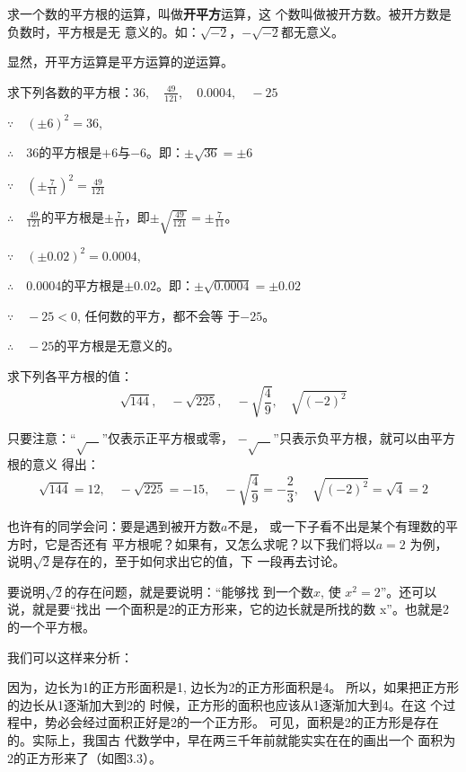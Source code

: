 求一个数的平方根的运算，叫做\textbf{开平方}运算，这
个数叫做被开方数。被开方数是负数时，平方根是无
意义的。如：$\sqrt{-2}$，$-\sqrt{-2}$都无意义。

显然，开平方运算是平方运算的逆运算。

\begin{example}
    求下列各数的平方根：$36,\quad \frac{49}{121},\quad 0.0004,\quad -25$
\end{example}

\begin{solution}
$\because\quad (\pm 6)^2=36$,

$\therefore\quad $36的平方根是$+6$与$-6$。即：$\pm\sqrt{36}=\pm 6$

$\because \quad \left(\pm \frac{7}{11}\right)^2=\frac{49}{121}$

$\therefore\quad \frac{49}{121}$的平方根是$\pm\frac{7}{11}$，即$\pm\sqrt{\frac{49}{121}}=\pm\frac{7}{11}$。

$\because\quad (\pm 0.02)^2=0.0004$,

$\therefore\quad $0.0004的平方根是$\pm 0.02$。即：$\pm\sqrt{0.0004}=\pm 0.02$

$\because\quad -25<0$, 任何数的平方，都不会等
于$-25$。

$\therefore\quad -25$的平方根是无意义的。
\end{solution}

\begin{example}
    求下列各平方根的值：
    \[\sqrt{144},\quad -\sqrt{225},\quad -\sqrt{\frac{4}{9}},\quad \sqrt{(-2)^2}   \]
\end{example}

\begin{solution}
    只要注意：“$\sqrt{\quad}$”仅表示正平方根或零，
    $-\sqrt{\quad}$”只表示负平方根，就可以由平方根的意义
得出：
\[\sqrt{144}=12,\quad -\sqrt{225}=-15,\quad -\sqrt{\frac{4}{9}}=-\frac{2}{3},\quad \sqrt{(-2)^2}=\sqrt{4}=2   \]
\end{solution}
    

也许有的同学会问：要是遇到被开方数$a$不是，
或一下子看不出是某个有理数的平方时，它是否还有
平方根呢？如果有，又怎么求呢？以下我们将以$a=2$
为例，说明$\sqrt{2}$是存在的，至于如何求出它的值，下
一段再去讨论。

要说明$\sqrt{2}$的存在问题，就是要说明：“能够找
到一个数$x$, 使
$x^2=2$”。还可以说，就是要“找出
一个面积是2的正方形来，它的边长就是所找的数
x”。也就是2的一个平方根。

我们可以这样来分析：

因为，边长为1的正方形面积是1,
边长为2的正方形面积是4。
所以，如果把正方形的边长从1逐渐加大到2的
时候，正方形的面积也应该从1逐渐加大到4。在这
个过程中，势必会经过面积正好是2的一个正方形。
可见，面积是2的正方形是存在的。实际上，我国古
代数学中，早在两三千年前就能实实在在的画出一个
面积为2的正方形来了（如图3.3）。



